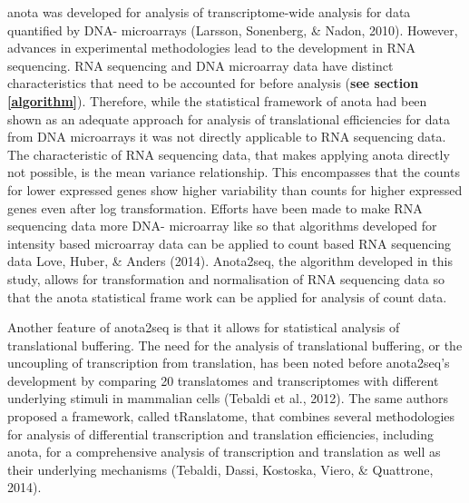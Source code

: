 \documentclass[
  12pt,
  openany]{book}
\begin{document}
anota was developed for analysis of transcriptome-wide analysis for data quantified by DNA- microarrays (Larsson, Sonenberg, \& Nadon, 2010). However, advances in experimental methodologies lead to the development in RNA sequencing. RNA sequencing and DNA microarray data have distinct characteristics that need to be accounted for before analysis (\textbf{see section \ref{algorithm}}). Therefore, while the statistical framework of anota had been shown as an adequate approach for analysis of translational efficiencies for data from DNA microarrays it was not directly applicable to RNA sequencing data. The characteristic of RNA sequencing data, that makes applying anota directly not possible, is the mean variance relationship. This encompasses that the counts for lower expressed genes show higher variability than counts for higher expressed genes even after log transformation. Efforts have been made to make RNA sequencing data more DNA- microarray like so that algorithms developed for intensity based microarray data can be applied to count based RNA sequencing data Love, Huber, \& Anders (2014). Anota2seq, the algorithm developed in this study, allows for transformation and normalisation of RNA sequencing data so that the anota statistical frame work can be applied for analysis of count data.

Another feature of anota2seq is that it allows for statistical analysis of translational buffering. The need for the analysis of translational buffering, or the uncoupling of transcription from translation, has been noted before anota2seq's development by comparing 20 translatomes and transcriptomes with different underlying stimuli in mammalian cells (Tebaldi et al., 2012). The same authors proposed a framework, called tRanslatome, that combines several methodologies for analysis of differential transcription and translation efficiencies, including anota, for a comprehensive analysis of transcription and translation as well as their underlying mechanisms (Tebaldi, Dassi, Kostoska, Viero, \& Quattrone, 2014).
\end{document}
